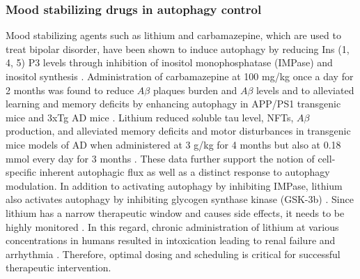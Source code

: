 \subsubsection{Mood stabilizing drugs in autophagy control}
Mood stabilizing agents such as lithium and carbamazepine, which are used to treat bipolar disorder, have been shown to induce autophagy by reducing Ins (1, 4, 5) P3 levels through inhibition of inositol monophosphatase (IMPase) and inositol synthesis \citep{Frake2015,sarkar2013}. Administration of carbamazepine at 100 mg/kg once a day for 2 months was found to reduce $A\beta$ plaques burden and $A\beta$ levels and to alleviated learning and memory deficits by enhancing autophagy in APP/PS1 transgenic mice \citep{Li2013} and 3xTg AD mice \citep{Zhang2017}. Lithium reduced soluble tau level, NFTs, $A\beta$ production, and alleviated memory deficits and motor disturbances in transgenic mice models of AD when administered at 3 g/kg for 4 months \citep{Shimada2012} but also at 0.18 mmol every day for 3 months \citep{Zhang2011}. These data further support the notion of cell-specific inherent autophagic flux as well as a distinct response to autophagy modulation. In addition to activating autophagy by inhibiting IMPase, lithium also activates autophagy by inhibiting glycogen synthase kinase (GSK-3b) \citep{Gonzalez-Polo2015,sarkar2013,Sarkar2007}. Since lithium has a narrow therapeutic window and causes side effects, it needs to be highly monitored \citep{Gonzalez-Polo2015}. In this regard, chronic administration of lithium at various concentrations in humans resulted in intoxication leading to renal failure and arrhythmia \citep{Chan2012,Gonzalez-Polo2015,Menegueti2012,Rej2012}. Therefore, optimal dosing and scheduling is critical for successful therapeutic intervention. 

